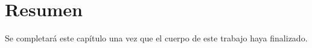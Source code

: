 \chapter*{Resumen}

Se completará este capítulo una vez que el cuerpo de este trabajo haya finalizado.


